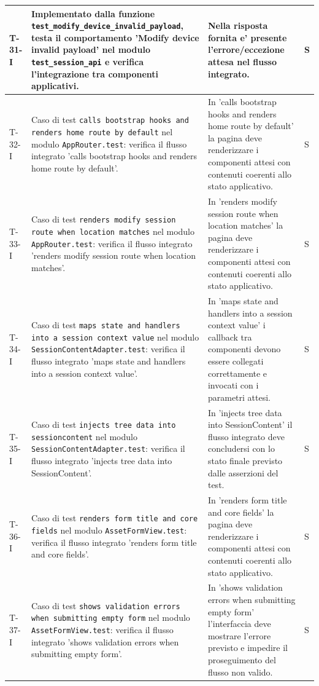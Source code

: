 \documentclass[a4paper,12pt]{article}
\begin{document}
{{\begin{longtable}{|>{\RaggedRight\arraybackslash}p{1.55cm}|>{\RaggedRight\arraybackslash}p{8.0cm}|>{\RaggedRight\arraybackslash}p{4.6cm}|>{\RaggedRight\arraybackslash}p{1.2cm}|}
        \hline
        T-31-I & Implementato dalla funzione \texttt{test\_\allowbreak modify\_\allowbreak device\_\allowbreak invalid\_\allowbreak payload}, testa il comportamento 'Modify device invalid payload' nel modulo \texttt{test\_\allowbreak session\_\allowbreak api} e verifica l'integrazione tra componenti applicativi. & Nella risposta fornita e' presente l'errore/eccezione attesa nel flusso integrato. & S \\
        \hline
        T-32-I & Caso di test \texttt{calls bootstrap hooks and renders home route by default} nel modulo \texttt{AppRouter.test}: verifica il flusso integrato 'calls bootstrap hooks and renders home route by default'. & In 'calls bootstrap hooks and renders home route by default' la pagina deve renderizzare i componenti attesi con contenuti coerenti allo stato applicativo. & S \\
        \hline
        T-33-I & Caso di test \texttt{renders modify session route when location matches} nel modulo \texttt{AppRouter.test}: verifica il flusso integrato 'renders modify session route when location matches'. & In 'renders modify session route when location matches' la pagina deve renderizzare i componenti attesi con contenuti coerenti allo stato applicativo. & S \\
        \hline
        T-34-I & Caso di test \texttt{maps state and handlers into a session context value} nel modulo \texttt{SessionContentAdapter.test}: verifica il flusso integrato 'maps state and handlers into a session context value'. & In 'maps state and handlers into a session context value' i callback tra componenti devono essere collegati correttamente e invocati con i parametri attesi. & S \\
        \hline
        T-35-I & Caso di test \texttt{injects tree data into sessioncontent} nel modulo \texttt{SessionContentAdapter.test}: verifica il flusso integrato 'injects tree data into SessionContent'. & In 'injects tree data into SessionContent' il flusso integrato deve concludersi con lo stato finale previsto dalle asserzioni del test. & S \\
        \hline
        T-36-I & Caso di test \texttt{renders form title and core fields} nel modulo \texttt{AssetFormView.test}: verifica il flusso integrato 'renders form title and core fields'. & In 'renders form title and core fields' la pagina deve renderizzare i componenti attesi con contenuti coerenti allo stato applicativo. & S \\
        \hline
        T-37-I & Caso di test \texttt{shows validation errors when submitting empty form} nel modulo \texttt{AssetFormView.test}: verifica il flusso integrato 'shows validation errors when submitting empty form'. & In 'shows validation errors when submitting empty form' l'interfaccia deve mostrare l'errore previsto e impedire il proseguimento del flusso non valido. & S \\

\end{longtable}}}
\end{document}
